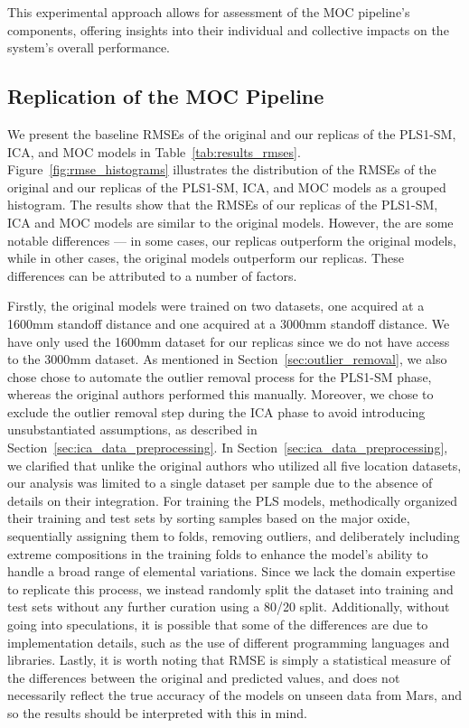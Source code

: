This experimental approach allows for assessment of the MOC pipeline's components, offering insights into their individual and collective impacts on the system's overall performance.

\subsection{Replication of the MOC Pipeline}\label{sec:replica_moc}
We present the baseline RMSEs of the original and our replicas of the PLS1-SM, ICA, and MOC models in Table~\ref{tab:results_rmses}.
Figure~\ref{fig:rmse_histograms} illustrates the distribution of the RMSEs of the original and our replicas of the PLS1-SM, ICA, and MOC models as a grouped histogram.
The results show that the RMSEs of our replicas of the PLS1-SM, ICA and MOC models are similar to the original models.
However, the are some notable differences --- in some cases, our replicas outperform the original models, while in other cases, the original models outperform our replicas.
These differences can be attributed to a number of factors.

Firstly, the original models were trained on two datasets, one acquired at a 1600mm standoff distance and one acquired at a 3000mm standoff distance.
We have only used the 1600mm dataset for our replicas since we do not have access to the 3000mm dataset.
As mentioned in Section~\ref{sec:outlier_removal}, we also chose chose to automate the outlier removal process for the PLS1-SM phase, whereas the original authors performed this manually.
Moreover, we chose to exclude the outlier removal step during the ICA phase to avoid introducing unsubstantiated assumptions, as described in Section~\ref{sec:ica_data_preprocessing}.
In Section~\ref{sec:ica_data_preprocessing}, we clarified that unlike the original authors who utilized all five location datasets, our analysis was limited to a single dataset per sample due to the absence of details on their integration.
For training the PLS models, \citet{andersonImprovedAccuracyQuantitative2017} methodically organized their training and test sets by sorting samples based on the major oxide, sequentially assigning them to folds, removing outliers, and deliberately including extreme compositions in the training folds to enhance the model's ability to handle a broad range of elemental variations.
Since we lack the domain expertise to replicate this process, we instead randomly split the dataset into training and test sets without any further curation using a 80/20 split.
Additionally, without going into speculations, it is possible that some of the differences are due to implementation details, such as the use of different programming languages and libraries.
Lastly, it is worth noting that RMSE is simply a statistical measure of the differences between the original and predicted values, and does not necessarily reflect the true accuracy of the models on unseen data from Mars, and so the results should be interpreted with this in mind.

